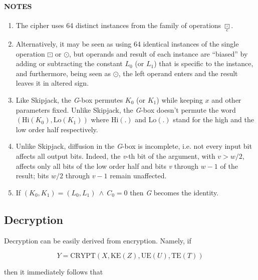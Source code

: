 \documentclass[a4paper,oneside,english]{amsart}
\numberwithin{equation}{section}
\numberwithin{figure}{section}
\begin{document}
\paragraph*{NOTES}
\begin{enumerate}
\item The cipher uses 64 distinct instances from the family of operations
$\underset{e}{\boxdot}$.
\item Alternatively, it may be seen as using 64 identical instances of the
single operation $\boxdot$ or $\odot$, but operands and result of
each instance are {}``biased'' by adding or subtracting the constant
$L_{0}$ (or $L_{1}$) that is specific to the instance, and furthermore,
being seen as $\odot$, the left operand enters and the result leaves
it in altered sign.
\item Like Skipjack, the \emph{G}-box permutes $K_{0}$ (or $K_{1}$) while
keeping $x$ and other parameters fixed. Unlike Skipjack, the \emph{G}-box
doesn't permute the word $(\mathrm{Hi}(K_{0}),\mathrm{Lo}(K_{1}))$
where $\mathrm{Hi}(.)$ and $\mathrm{Lo}(.)$ stand for the high and
the low order half respectively.
\item Unlike Skipjack, diffusion in the \emph{G}-box is incomplete, i.e.
not every input bit affects all output bits. Indeed, the \emph{v}-th
bit of the argument, with $v>w/2$, affects only all bits of the low
order half and bits \emph{v} through $w-1$ of the result; bits $w/2$
through $v-1$ remain unaffected.
\item If $(K_{0},K_{1})=(L_{0},L_{1})\:\wedge\: C_{0}=0$ then \emph{G}
becomes the identity.
\end{enumerate}

\subsection{Decryption}

Decryption can be easily derived from encryption. Namely, if

\[
\mathrm{\mathit{Y}=CRYPT}(X,\mathrm{KE}(Z),\mathrm{UE}(U),\mathrm{TE}(T))
\]


then it immediately follows that
\end{document}
